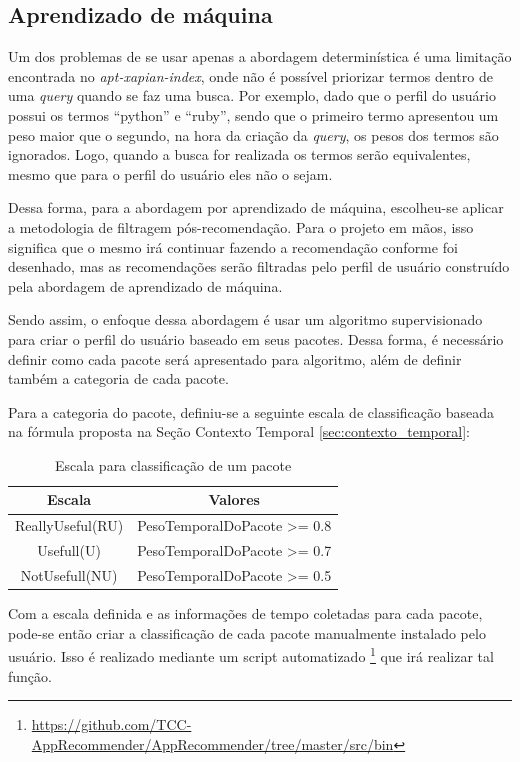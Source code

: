 \subsection{Aprendizado de máquina}

Um dos problemas de se usar apenas a abordagem determinística é uma limitação
encontrada no \textit{apt-xapian-index}, onde não é possível priorizar termos
dentro de uma \textit{query} quando se faz uma busca. Por exemplo, dado que o perfil
do usuário possui os termos ``python'' e ``ruby'', sendo que o primeiro termo
apresentou um peso maior que o segundo, na hora da criação da \textit{query}, os pesos
dos termos são ignorados. Logo, quando a busca for realizada os termos serão
equivalentes, mesmo que para o perfil do usuário eles não o sejam.

Dessa forma, para a abordagem por aprendizado de máquina, escolheu-se aplicar a
metodologia de filtragem pós-recomendação. Para o projeto em mãos, isso
significa que o mesmo irá continuar fazendo a recomendação conforme foi
desenhado, mas as recomendações serão filtradas pelo perfil de usuário
construído pela abordagem de aprendizado de máquina.

Sendo assim, o enfoque dessa abordagem é usar um algoritmo supervisionado
para criar o perfil do usuário baseado em seus pacotes. Dessa forma, é
necessário definir como cada pacote será apresentado para algoritmo, além de
definir também a categoria de cada pacote.

Para a categoria do pacote, definiu-se a seguinte escala de classificação baseada na
fórmula proposta na Seção Contexto Temporal \ref{sec:contexto_temporal}:

\begin{table}[h]
\centering
\begin{tabular}{cc}
\hline
\rowcolor[HTML]{EFEFEF}
{Escala} & {Valores} \\ \hline
{ReallyUseful(RU)}  & PesoTemporalDoPacote >= 0.8                  \\ \hline
{Usefull(U)}   & PesoTemporalDoPacote >= 0.7                  \\ \hline
{NotUsefull(NU)}   & PesoTemporalDoPacote >= 0.5                  \\ \hline
\end{tabular}
\caption{Escala para classificação de um pacote}
\label{tab:classificacao_pacotes}
\end{table}


Com a escala definida e as informações de tempo coletadas para cada pacote,
pode-se então criar a classificação de cada pacote manualmente instalado pelo
usuário.
Isso é realizado mediante um script automatizado \footnote{\url{https://github.com/TCC-AppRecommender/AppRecommender/tree/master/src/bin}}
que irá realizar tal função.

